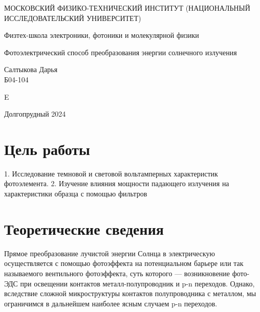 \documentclass[a4paper,12pt]{article} %
\begin{document}
\newenvironment{lines}[1][\textwidth] %
{
\newcolumntype{E}{>{}p{#1}<{\hrulefill}} %
\begin{flushright} %
\begin{tabular}[h]{E} %
}
{\end{tabular}\end{flushright}
}
	
	\begin{titlepage}
	\begin{center}
		{\large МОСКОВСКИЙ ФИЗИКО-ТЕХНИЧЕСКИЙ ИНСТИТУТ (НАЦИОНАЛЬНЫЙ ИССЛЕДОВАТЕЛЬСКИЙ УНИВЕРСИТЕТ)}
	\end{center}
	\begin{center}
		{\large Физтех-школа электроники, фотоники и молекулярной физики}
	\end{center}
	
	
	\vspace{4.5cm}
	{\huge
		\begin{center}
			Фотоэлектрический способ преобразования энергии солнечного
излучения
		\end{center}
	}
	\vspace{2cm}
	\begin{flushright}
		{\LARGE Салтыкова Дарья \\
			\vspace{0.5cm}
			Б04-104}
	\end{flushright}
	
	\vspace{0.5cm}
	
	\begin{lines}[.5
	\textwidth]
  
\end{lines}
	\vspace{8cm}
	\begin{center}
		Долгопрудный 2024
	\end{center}
\end{titlepage}

\section{Цель работы} 
1.	Исследование темновой и световой вольтамперных характеристик фотоэлемента.
2.	Изучение влияния мощности падающего излучения на характеристики образца с помощью фильтров


\section{Теоретические сведения}
Прямое преобразование лучистой энергии Солнца в электрическую осуществляется с помощью фотоэффекта на потенциальном барьере или так называемого вентильного фотоэффекта, суть которого — возникновение фото-ЭДС при освещении контактов металл-полупроводник и p-n переходов. Однако, вследствие сложной микроструктуры контактов полупроводника с металлом, мы ограничимся в дальнейшем наиболее ясным случаем p-n переходов.
\end{document}
